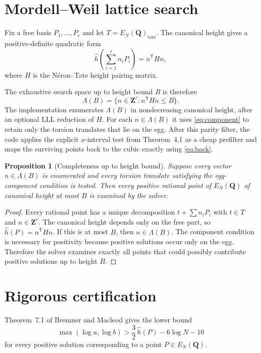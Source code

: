 \documentclass[11pt]{article}
\newtheorem{proposition}[theorem]{Proposition}
\newcommand{\Q}{\mathbf Q}
\newcommand{\Z}{\mathbf Z}
\newcommand{\hhat}{\hat h}
\begin{document}
\section{Mordell--Weil lattice search}
Fix a free basis $P_1,\dots,P_r$ and let $T=E_N(\Q)_{\mathrm{tors}}$. The canonical height gives a positive-definite quadratic form
\[
\hhat\!\left(\sum_{i=1}^r n_iP_i\right)=n^{\mathsf T}Hn,
\]
where $H$ is the N\'eron--Tate height pairing matrix.

The exhaustive search space up to height bound $B$ is therefore
\[
\Lambda(B)=\{n\in\Z^r:n^{\mathsf T}Hn\le B\}.
\]
The implementation enumerates $\Lambda(B)$ in nondecreasing canonical height, after an optional LLL reduction of $H$. For each $n\in\Lambda(B)$ it uses \eqref{eq:component} to retain only the torsion translates that lie on the egg. After this parity filter, the code applies the explicit $x$-interval test from Theorem~4.1 as a cheap prefilter and maps the surviving points back to the cubic exactly using \eqref{eq:back}.

\begin{proposition}[Completeness up to height bound]
Suppose every vector $n\in\Lambda(B)$ is enumerated and every torsion translate satisfying the egg-component condition is tested. Then every positive rational point of $E_N(\Q)$ of canonical height at most $B$ is examined by the solver.
\end{proposition}

\begin{proof}
Every rational point has a unique decomposition $t+\sum n_iP_i$ with $t\in T$ and $n\in\Z^r$. The canonical height depends only on the free part, so $\hhat(P)=n^{\mathsf T}Hn$. If this is at most $B$, then $n\in\Lambda(B)$. The component condition is necessary for positivity because positive solutions occur only on the egg. Therefore the solver examines exactly all points that could possibly contribute positive solutions up to height $B$.
\end{proof}

\section{Rigorous certification}
Theorem~7.1 of Bremner and Macleod \cite{BremnerMacleod2014} gives the lower bound
\begin{equation}\label{eq:BM-bound}
\max(\log a,\log b)>\frac32\,\hhat(P)-6\log N-10
\end{equation}
for every positive solution corresponding to a point $P\in E_N(\Q)$.
\end{document}
